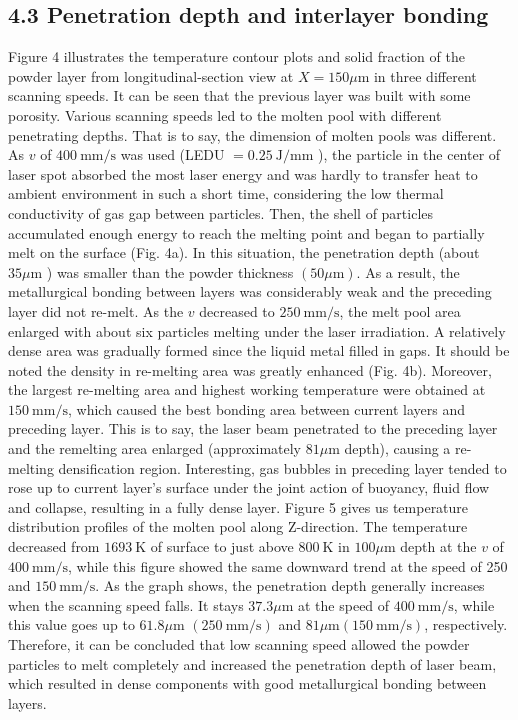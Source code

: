 \documentclass[10pt]{article}
\begin{document}
\subsection*{4.3 Penetration depth and interlayer bonding}
Figure 4 illustrates the temperature contour plots and solid fraction of the powder layer from longitudinal-section view at $X=150 \mu \mathrm{m}$ in three different scanning speeds. It can be seen that the previous layer was built with some porosity. Various scanning speeds led to the molten pool with different penetrating depths. That is to say, the dimension of molten pools was different. As $v$ of $400 \mathrm{~mm} / \mathrm{s}$ was used (LEDU $=0.25 \mathrm{~J} / \mathrm{mm}$ ), the particle in the center of laser spot absorbed the most laser energy and was hardly to transfer heat to ambient environment in such a short time, considering the low thermal conductivity of gas gap between particles. Then, the shell of particles accumulated enough energy to reach the melting point and began to partially melt on the surface (Fig. 4a). In this situation, the penetration depth (about $35 \mu \mathrm{m}$ ) was smaller than the powder thickness $(50 \mu \mathrm{m})$. As a result, the metallurgical bonding between layers was considerably weak and the preceding layer did not re-melt. As the $v$ decreased to $250 \mathrm{~mm} / \mathrm{s}$, the melt pool area enlarged with about six particles melting under the laser irradiation. A relatively dense area was gradually formed since the liquid metal filled in gaps. It should be noted the density in re-melting area was greatly enhanced (Fig. 4b). Moreover, the largest re-melting area and highest working temperature were obtained at $150 \mathrm{~mm} / \mathrm{s}$, which caused the best bonding area between current layers and preceding layer. This is to say, the laser beam penetrated to the preceding layer and the remelting area enlarged (approximately $81 \mu \mathrm{m}$ depth), causing a re-melting densification region. Interesting, gas bubbles in preceding layer tended to rose up to current layer's surface under the joint action of buoyancy, fluid flow and collapse, resulting in a fully dense layer. Figure 5 gives us temperature distribution profiles of the molten pool along Z-direction. The temperature decreased from $1693 \mathrm{~K}$ of surface to just above $800 \mathrm{~K}$ in $100 \mu \mathrm{m}$ depth at the $v$ of $400 \mathrm{~mm} / \mathrm{s}$, while this figure showed the same downward trend at the speed of 250 and $150 \mathrm{~mm} / \mathrm{s}$. As the graph shows, the penetration depth generally increases when the scanning speed falls. It stays $37.3 \mu \mathrm{m}$ at the speed of $400 \mathrm{~mm} / \mathrm{s}$, while this value goes up to $61.8 \mu \mathrm{m}$ $(250 \mathrm{~mm} / \mathrm{s})$ and $81 \mu \mathrm{m}(150 \mathrm{~mm} / \mathrm{s})$, respectively. Therefore, it can be concluded that low scanning speed allowed the powder particles to melt completely and increased the penetration depth of laser beam, which resulted in dense components with good metallurgical bonding between layers.
\end{document}
